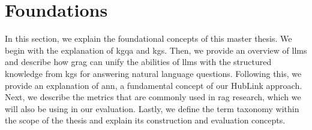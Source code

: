 \chapter{Foundations}
\label{ch:fundamentals}


In this section, we explain the foundational concepts of this master thesis. We begin with the explanation of \gls{kgqa} and \glspl{kg}. Then, we provide an overview of \glspl{llm} and describe how \gls{grag} can unify the abilities of \glspl{llm} with the structured knowledge from \glspl{kg} for answering natural language questions. Following this, we provide an explanation of \gls{ann}, a fundamental concept of our HubLink approach. Next, we describe the metrics that are commonly used in \gls{rag} research, which we will also be using in our evaluation. Lastly, we define the term taxonomy within the scope of the thesis and explain its construction and evaluation concepts.








